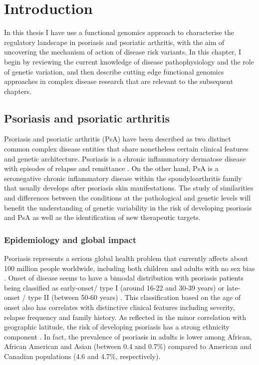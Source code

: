 \chapter{Introduction}
\label{ch:Intro}



In this thesis I have use a functional genomics approach to characterise the regulatory landscape in psoriasis and psoriatic arthritis, with the aim of uncovering the mechanism of action of disease risk variants. In this chapter, I begin by reviewing the current knowledge of disease pathophysiology and the role of genetic variation, and then describe cutting edge functional genomics approaches in complex disease research that are relevant to the subsequent chapters.

\section{Psoriasis and psoriatic arthritis}
%
Psoriasis and psoriatic arthritis (PsA) have been described as two distinct common complex disease entities that share nonetheless certain clinical features and genetic architecture. Psoriasis is a chronic inflammatory dermatose disease with episodes of relapse and remittance \parencite{Nestle2009}. On the other hand, PsA is a seronegative chronic inflammatory disease within the spondyloarthritis family that usually develops after psoriasis skin manifestations\parencite{Moll1973, Coates2016, Villanova2016}. The study of similarities and differences between the conditions at the pathological and genetic levels will benefit the understanding of genetic variability in the risk of developing psoriasis and PsA as well as the identification of new therapeutic targets.


\subsection{Epidemiology and global impact}
%
Psoriasis represents a serious global health problem that currently affects about 100 million people worldwide, including both children and adults with no sex bias \parencite{Organization2016}. Onset of disease seems to have a bimodal distribution with psoriasis patients being classified as early-onset/ type I (around 16-22 and 30-39 years) or late-onset / type II (between 50-60 years) \parencite{Henseler1985}. This classification based on the age of onset also has correlates with distinctive clinical features including severity, relapse frequency and family history. As reflected in the minor correlation with geographic latitude, the risk of developing psoriasis has a strong ethnicity component \parencite{Jacobson2011}. In fact, the prevalence of psoriasis in adults is lower among African, African American and Asian (between 0.4 and 0.7\%) compared to American and Canadian populations (4.6 and 4.7\%, respectively). 

